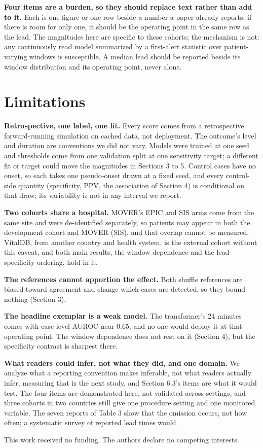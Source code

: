 \textbf{Four items are a burden, so they should replace text rather than add to it.} Each is one
figure or one row beside a number a paper already reports; if there is room for only one, it
should be the operating point in the same row as the lead. The magnitudes here are specific to
these cohorts; the mechanism is not: any continuously read model summarized by a first-alert
statistic over patient-varying windows is susceptible. A median lead should be
reported beside its window distribution and its operating point, never alone.

\section{Limitations}\label{limitations}

\textbf{Retrospective, one label, one fit.} Every score comes from a retrospective forward-running
simulation on cached data, not deployment. The outcome's level and duration are conventions we
did not vary. Models were trained at one seed and thresholds come from one validation split at one
sensitivity target; a different fit or target could move the magnitudes in Sections 3 to 5.
Control cases have no onset, so each takes one pseudo-onset drawn at a fixed seed, and every
control-side quantity (specificity, PPV, the association of Section 4) is conditional on that
draw; its variability is not in any interval we report.

\textbf{Two cohorts share a hospital.} MOVER's EPIC and SIS arms come from the same site and were
de-identified separately, so patients may appear in both the development cohort and MOVER (SIS),
and that overlap cannot be measured. VitalDB, from another country and health system, is the
external cohort without this caveat, and both main results, the window dependence and the
lead-specificity ordering, hold in it.

\textbf{The references cannot apportion the effect.} Both shuffle references are biased toward
agreement and change which cases are detected, so they bound nothing (Section 3).

\textbf{The headline exemplar is a weak model.} The transformer's 24 minutes comes with case-level
AUROC near 0.65, and no one would deploy it at that operating point. The window dependence does
not rest on it (Section 4), but the specificity contrast is sharpest there.

\textbf{What readers could infer, not what they did, and one domain.} We analyze what a reporting convention makes
inferable, not what readers actually infer; measuring that is the next study, and Section 6.3's
items are what it would test. The four items are demonstrated here, not validated across
settings, and three cohorts in two countries still give one procedure setting and one monitored
variable. The seven reports of Table 3 show that the omission occurs, not how
often; a systematic survey of reported lead times would.

\begin{ack}
This work received no funding. The authors declare no competing interests.
\end{ack}


